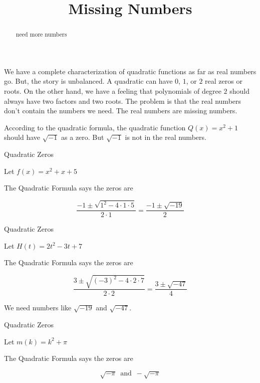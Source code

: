 \documentclass{ximera}
\title{Missing Numbers}
\begin{document}
\begin{abstract}
need more numbers
\end{abstract}
\maketitle




We have a complete characterization of quadratic functions as far as real numbers go.  But, the story is unbalanced.  A quadratic can have $0$, $1$, or $2$ real zeros or roots.  On the other hand, we have a feeling that polynomials of degree $2$ should always have two factors and two roots.  The problem is that the real numbers don't contain the numbers we need.  The real numbers are missing numbers.


According to the quadratic formula, the quadratic function $Q(x) = x^2 + 1$ should have $\sqrt{-1}$ as a zero.  But $\sqrt{-1}$ is not in the real numbers. 




\begin{example}  Quadratic Zeros
   
  
Let $f(x) = x^2 + x + 5$


The Quadratic Formula says the zeros are 


\[
\frac{-1 \pm \sqrt{1^2 - 4 \cdot 1 \cdot 5}}{2 \cdot 1} = \frac{-1 \pm \sqrt{-19}}{2}
\]


\end{example}






\begin{example}   Quadratic Zeros
   
  
Let $H(t) = 2t^2 - 3t + 7$


The Quadratic Formula says the zeros are 


\[
\frac{3 \pm \sqrt{(-3)^2 - 4 \cdot 2 \cdot 7}}{2 \cdot 2} = \frac{3 \pm \sqrt{-47}}{4}
\]


\end{example}



We need numbers like $\sqrt{-19}$ and $\sqrt{-47}$. 









\begin{example}   Quadratic Zeros
   
  
Let $m(k) = k^2 + \pi $


The Quadratic Formula says the zeros are 


\[
\sqrt{-\pi} \, \text{ and } \, -\sqrt{-\pi}
\]


\end{example}
\end{document}
